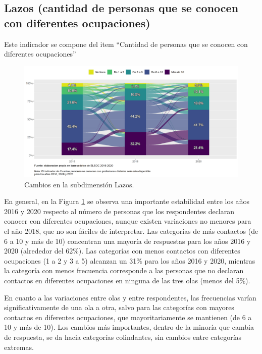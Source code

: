\documentclass[
  12pt,
]{book}
\begin{document}
\hypertarget{lazos-cantidad-de-personas-que-se-conocen-con-diferentes-ocupaciones}{%
\subsection{Lazos (cantidad de personas que se conocen con diferentes ocupaciones)}\label{lazos-cantidad-de-personas-que-se-conocen-con-diferentes-ocupaciones}}

Este indicador se compone del item ``Cantidad de personas que se conocen con diferentes ocupaciones''

\begin{figure}[H]

{\centering \includegraphics[width=1\linewidth,height=1\textheight]{output/graphs/alluvial_lazos} 

}

\caption{Cambios en la subdimensión Lazos.}\label{fig:alluvial-lazos}
\end{figure}

En general, en la Figura \ref{fig:alluvial-lazos} se observa una importante estabilidad entre los años 2016 y 2020 respecto al número de personas que los respondentes declaran conocer con diferentes ocupaciones, aunque existen variaciones no menores para el año 2018, que no son fáciles de interpretar. Las categorías de más contactos (de 6 a 10 y más de 10) concentran una mayoría de respuestas para los años 2016 y 2020 (alrededor del 62\%). Las categorías con menos contactos con diferentes ocupaciones (1 a 2 y 3 a 5) alcanzan un 31\% para los años 2016 y 2020, mientras la categoría con menos frecuencia corresponde a las personas que no declaran contactos en diferentes ocupaciones en ninguna de las tres olas (menos del 5\%).

En cuanto a las variaciones entre olas y entre respondentes, las frecuencias varían significativamente de una ola a otra, salvo para las categorías con mayores contactos en diferentes ocupaciones, que mayoritariamente se mantienen (de 6 a 10 y más de 10). Los cambios más importantes, dentro de la minoría que cambia de respuesta, se da hacia categorías colindantes, sin cambios entre categorías extremas.
\end{document}
